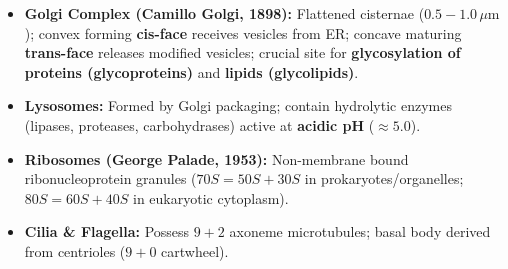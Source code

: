 \documentclass[10pt,a4paper]{article}
\begin{document}
\begin{conceptbox}
\begin{itemize}
  \item \textbf{Golgi Complex (Camillo Golgi, 1898):} Flattened cisternae ($0.5-1.0\,\mu\mathrm{m}$); convex forming \textbf{cis-face} receives vesicles from ER; concave maturing \textbf{trans-face} releases modified vesicles; crucial site for \textbf{glycosylation of proteins (glycoproteins)} and \textbf{lipids (glycolipids)}.
  \item \textbf{Lysosomes:} Formed by Golgi packaging; contain hydrolytic enzymes (lipases, proteases, carbohydrases) active at \textbf{acidic pH} ($\approx 5.0$).
  \item \textbf{Ribosomes (George Palade, 1953):} Non-membrane bound ribonucleoprotein granules ($70S = 50S + 30S$ in prokaryotes/organelles; $80S = 60S + 40S$ in eukaryotic cytoplasm).
  \item \textbf{Cilia \& Flagella:} Possess $9+2$ axoneme microtubules; basal body derived from centrioles ($9+0$ cartwheel).
\end{itemize}
\end{conceptbox}
\end{document}
